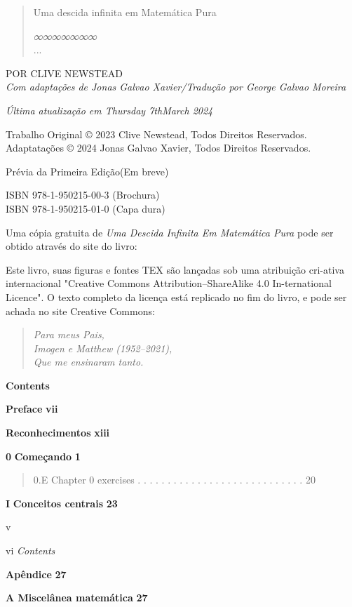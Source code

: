 \documentclass[
]{article}
\author{}
\date{}
\begin{document}
\begin{quote}
Uma descida infinita em Matemática Pura

\emph{∞∞∞∞∞∞∞}\\
...
\end{quote}

POR CLIVE NEWSTEAD\\
\emph{Com adaptações de Jonas Galvao Xavier/Tradução por George Galvao
Moreira}

\emph{Última atualização em Thursday 7thMarch 2024}

Trabalho Original © 2023 Clive Newstead, Todos Direitos Reservados.
Adaptatações © 2024 Jonas Galvao Xavier, Todos Direitos Reservados.

Prévia da Primeira Edição(Em breve)

ISBN 978-1-950215-00-3 (Brochura)\\
ISBN 978-1-950215-01-0 (Capa dura)

Uma cópia gratuita de \emph{Uma Descida Infinita Em Matemática Pura}
pode ser obtido através do site do livro:

Este livro, suas figuras e fontes TEX são lançadas sob uma atribuição
cri-ativa internacional "Creative Commons Attribution--ShareAlike 4.0
In-ternational Licence". O texto completo da licença está replicado no
fim do livro, e pode ser achada no site Creative Commons:

\begin{quote}
\emph{Para meus Pais,}\\
\emph{Imogen e Matthew (1952--2021),}\\
\emph{Que me ensinaram tanto.}
\end{quote}

\textbf{Contents}

\textbf{Preface} \textbf{vii}

\textbf{Reconhecimentos} \textbf{xiii}

\textbf{0} \textbf{Começando} \textbf{1}

\begin{quote}
0.E Chapter 0 exercises . . . . . . . . . . . . . . . . . . . . . . . .
. . . . 20
\end{quote}

\textbf{I} \textbf{Conceitos centrais} \textbf{23}

v

vi \emph{Contents}

\textbf{Apêndice} \textbf{27}

\textbf{A Miscelânea matemática} \textbf{27}
\end{document}
